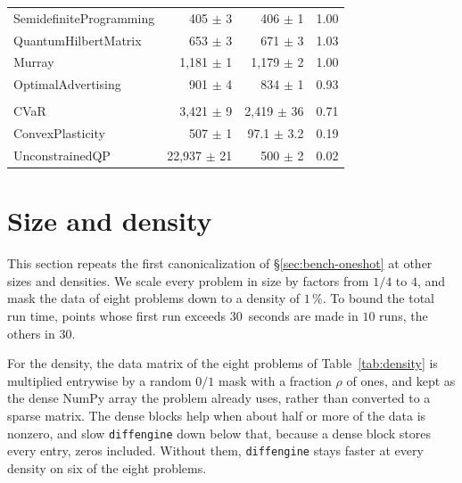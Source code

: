 \begin{table}[htbp]
{\begin{tabular}{l rr r}
SemidefiniteProgramming & 405 $\pm$ 3 & 406 $\pm$ 1 & 1.00 \\
QuantumHilbertMatrix & 653 $\pm$ 3 & 671 $\pm$ 3 & 1.03 \\
Murray & 1{,}181 $\pm$ 1 & 1{,}179 $\pm$ 2 & 1.00 \\
OptimalAdvertising & 901 $\pm$ 4 & 834 $\pm$ 1 & 0.93 \\
\addlinespace
\multicolumn{4}{l}{\textit{Dense blocks hurt}} \\
CVaR & 3{,}421 $\pm$ 9 & 2{,}419 $\pm$ 36 & 0.71 \\
ConvexPlasticity & 507 $\pm$ 1 & 97.1 $\pm$ 3.2 & 0.19 \\
UnconstrainedQP & 22{,}937 $\pm$ 21 & 500 $\pm$ 2 & 0.02 \\
\bottomrule
\end{tabular}}
\end{table}

\FloatBarrier

\section{Size and density}
\label{sec:bench-sensitivity}

This section repeats the first canonicalization of \S\ref{sec:bench-oneshot} at other sizes and
densities. We scale every problem in size by factors from $1/4$ to $4$, and mask the data of eight
problems down to a density of $1\,\%$. To bound the total run time, points whose first run exceeds
$30$~seconds are made in $10$ runs, the others in $30$.

For the density, the data matrix of the eight problems of Table~\ref{tab:density} is multiplied entrywise by a random $0/1$
mask with a fraction $\rho$ of ones, and kept as the dense NumPy array the problem already
uses, rather than converted to a sparse matrix. The dense
blocks help when about half or more of the data is nonzero, and slow \texttt{diffengine} down
below that, because a dense block stores every entry, zeros included. Without them, \texttt{diffengine} stays
faster at every density on six of the eight problems.

